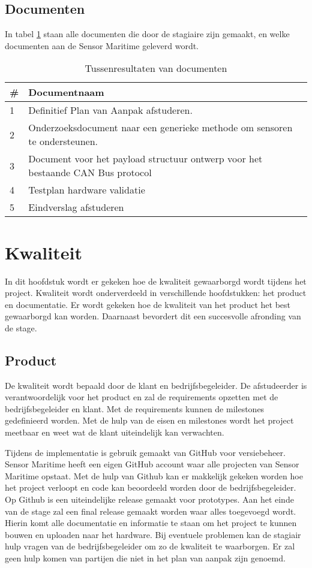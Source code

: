 \subsection{Documenten}
In tabel \ref{tab:documents} staan  alle documenten die door de stagiaire zijn gemaakt, en welke documenten aan de Sensor Maritime geleverd wordt.
\begin{table}[h!] 
	\caption{Tussenresultaten van documenten}
	\begin{tabular}{p{1cm}p{14cm}}
	\toprule
	\textbf{\#} & \textbf{Documentnaam}   \\ \midrule
	1 & Definitief Plan van Aanpak afstuderen. \\
	2 & Onderzoeksdocument naar een generieke methode om sensoren te ondersteunen. \\
	3 & Document voor het payload structuur ontwerp voor het bestaande CAN Bus protocol \\
	4 & Testplan hardware validatie \\
	5 & Eindverslag afstuderen \\ \bottomrule
	\end{tabular}

\label{tab:documents}
\end{table}

\newpage
\section{Kwaliteit}
In dit hoofdstuk wordt er gekeken hoe de kwaliteit gewaarborgd wordt tijdens het project. Kwaliteit wordt onderverdeeld in verschillende hoofdstukken: het product en documentatie. Er wordt gekeken hoe de kwaliteit van het product het best gewaarborgd kan worden. Daarnaast bevordert dit een succesvolle afronding van de stage.

\subsection{Product}
De kwaliteit wordt bepaald door de klant en bedrijfsbegeleider. De afstudeerder is verantwoordelijk voor het product en zal de requirements opzetten met de bedrijfsbegeleider en klant. Met de requirements kunnen de milestones gedefinieerd worden. Met de hulp van de eisen en milestones wordt het project meetbaar en weet wat de klant uiteindelijk kan verwachten. \newline

\noindent Tijdens de implementatie is gebruik gemaakt van GitHub voor versiebeheer. Sensor Maritime heeft een eigen GitHub account waar alle projecten van Sensor Maritime opstaat. Met de hulp van Github kan er makkelijk gekeken worden hoe het project verloopt en code kan beoordeeld worden door de bedrijfsbegeleider. Op Github is een uiteindelijke release gemaakt voor prototypes. Aan het einde van de stage zal een final release gemaakt worden waar alles toegevoegd wordt. Hierin komt alle documentatie en informatie te staan om het project te kunnen bouwen en uploaden naar het hardware. Bij eventuele problemen kan de stagiair hulp vragen van de bedrijfsbegeleider om zo de kwaliteit te waarborgen. Er zal geen hulp komen van partijen die niet in het plan van aanpak zijn genoemd.

